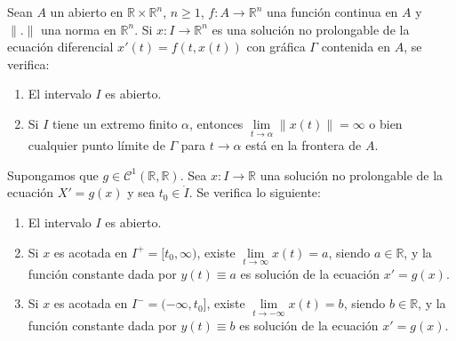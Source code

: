 \begin{theorem}
    Sean $A$ un abierto en $\mathbb{R} \times \mathbb{R}^n$, $n \geq 1$, $f: A \to \mathbb{R}^n$ una función continua en $A$ y $\|.\|$ una norma en $\mathbb{R}^n$.
    Si $x: I \to \mathbb{R}^n$ es una solución no prolongable de la ecuación diferencial $x'(t) = f(t, x(t))$ con gráfica $\Gamma$ contenida en $A$, se verifica:
    \begin{enumerate}
        \item El intervalo $I$ es abierto.
        \item Si $I$ tiene un extremo finito $\alpha$, entonces $\lim\limits_{t \to \alpha} \|x(t)\| = \infty$ o bien cualquier punto límite de $\Gamma$ para $t \to \alpha$ está en la frontera de $A$.
    \end{enumerate}
\end{theorem}

\begin{theorem}
    Supongamos que $g \in \mathcal{C}^1(\mathbb{R}, \mathbb{R})$.
    Sea $x: I \to \mathbb{R}$ una solución no prolongable de la ecuación $X' = g(x)$ y sea $t_0 \in \dot{I}$.
    Se verifica lo siguiente:
    \begin{enumerate}
        \item El intervalo $I$ es abierto.
        \item Si $x$ es acotada en $I^+ = [t_0, \infty)$, existe $\lim\limits_{t \to \infty} x(t) = a$, siendo $a \in \mathbb{R}$, y la función constante dada por $y(t) \equiv a$ es solución de la ecuación $x' = g(x)$.
        \item Si $x$ es acotada en $I^- = (-\infty, t_0]$, existe $\lim\limits_{t \to -\infty} x(t) = b$, siendo $b \in \mathbb{R}$, y la función constante dada por $y(t) \equiv b$ es solución de la ecuación $x' = g(x)$.
    \end{enumerate}
\end{theorem}